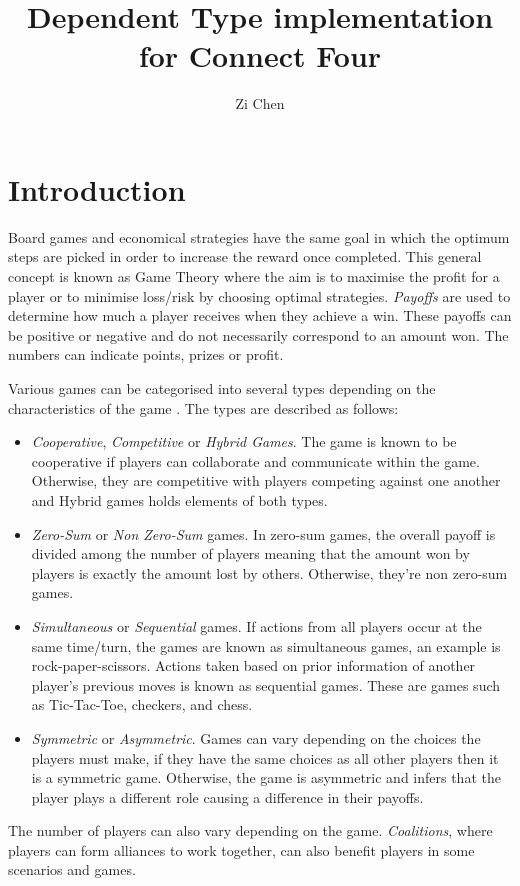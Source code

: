 \documentclass[12pt]{article}
\title{Dependent Type implementation for Connect Four}
\author{Zi Chen}
\date{}
\theoremstyle{definition}
\begin{document}
\maketitle

\section{Introduction}
Board games and economical strategies have the same goal in which the optimum steps are picked in order to increase the reward once completed. This general concept is known as Game Theory where the aim is to maximise the profit for a player or to minimise loss/risk by choosing optimal strategies. \emph{Payoffs} are used to determine how much a player receives when they achieve a win. These payoffs can be positive or negative and do not necessarily correspond to an amount won. The numbers can indicate points, prizes or profit.

Various games can be categorised into several types depending on the characteristics of the game \cite{Burguillo2018}. The types are described as follows:
\begin{itemize}
\item \emph{Cooperative}, \emph{Competitive} or \emph{Hybrid Games}. The game is known to be cooperative if players can collaborate and communicate within the game. Otherwise, they are competitive with players competing against one another and Hybrid games holds elements of both types.
\item \emph{Zero-Sum} or \emph{Non Zero-Sum} games. In zero-sum games, the overall payoff is divided among the number of players meaning that the amount won by players is exactly the amount lost by others. Otherwise, they're non zero-sum games.
\item \emph{Simultaneous} or \emph{Sequential} games. If actions from all players occur at the same time/turn, the games are known as simultaneous games, an example is rock-paper-scissors. Actions taken based on prior information of another player's previous moves is known as sequential games. These are games such as Tic-Tac-Toe, checkers, and chess.
\item \emph{Symmetric} or \emph{Asymmetric}. Games can vary depending on the choices the players must make, if they have the same choices as all other players then it is a symmetric game. Otherwise, the game is asymmetric and infers that the player plays a different role causing a difference in their payoffs.
\end{itemize}
The number of players can also vary depending on the game. \emph{Coalitions}, where players can form alliances to work together, can also benefit players in some scenarios and games. 
\end{document}

